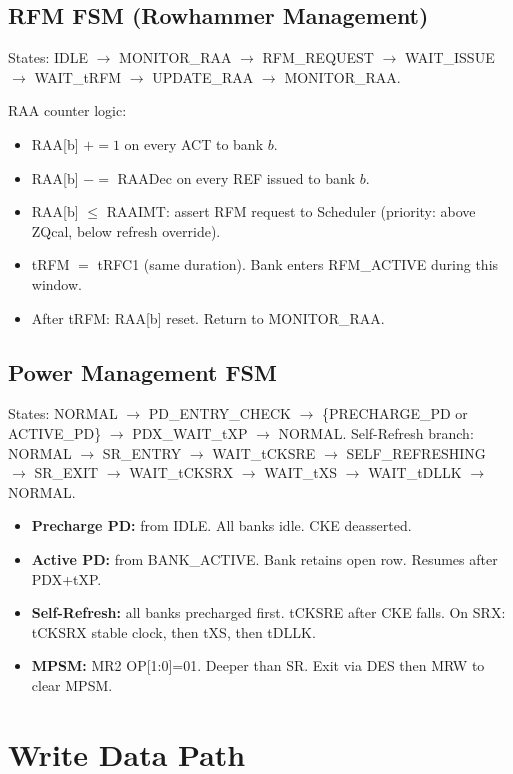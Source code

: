 \documentclass[10pt,a4paper]{article}
\begin{document}
\subsection{RFM FSM (Rowhammer Management)}

States: IDLE $\to$ MONITOR\_RAA $\to$ RFM\_REQUEST $\to$ WAIT\_ISSUE $\to$ WAIT\_tRFM
$\to$ UPDATE\_RAA $\to$ MONITOR\_RAA.

RAA counter logic:
\begin{itemize}
  \item RAA[b] $+= 1$ on every ACT to bank $b$.
  \item RAA[b] $-=$ RAADec on every REF issued to bank $b$.
  \item RAA[b] $\leq$ RAAIMT: assert RFM request to Scheduler (priority: above ZQcal, below refresh override).
  \item tRFM $=$ tRFC1 (same duration). Bank enters RFM\_ACTIVE during this window.
  \item After tRFM: RAA[b] reset. Return to MONITOR\_RAA.
\end{itemize}

\subsection{Power Management FSM}

States: NORMAL $\to$ PD\_ENTRY\_CHECK $\to$ \{PRECHARGE\_PD or ACTIVE\_PD\} $\to$
PDX\_WAIT\_tXP $\to$ NORMAL. Self-Refresh branch: NORMAL $\to$ SR\_ENTRY $\to$
WAIT\_tCKSRE $\to$ SELF\_REFRESHING $\to$ SR\_EXIT $\to$ WAIT\_tCKSRX $\to$
WAIT\_tXS $\to$ WAIT\_tDLLK $\to$ NORMAL.

\begin{itemize}
  \item \textbf{Precharge PD:} from IDLE. All banks idle. CKE deasserted.
  \item \textbf{Active PD:} from BANK\_ACTIVE. Bank retains open row. Resumes after PDX+tXP.
  \item \textbf{Self-Refresh:} all banks precharged first. tCKSRE after CKE falls. On SRX:
        tCKSRX stable clock, then tXS, then tDLLK.
  \item \textbf{MPSM:} MR2 OP[1:0]=01. Deeper than SR. Exit via DES then MRW to clear MPSM.
\end{itemize}

\section{Write Data Path}
\end{document}
